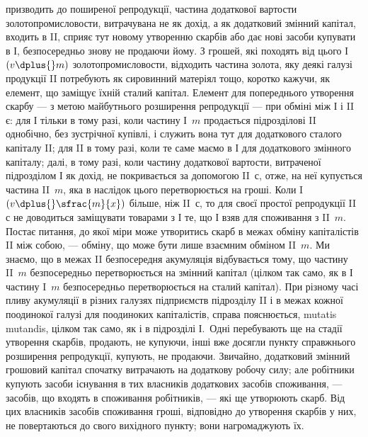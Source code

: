 \parcont{}  %
призводить до поширеної репродукції, частина додаткової вартости золотопромисловости,
витрачувана не як дохід, а як додатковий змінний
капітал, входить в II, сприяє тут новому утворенню скарбів або дає нові
засоби купувати в І, безпосередньо знову не продаючи йому. З грошей,
які походять від цього І~$(v \dplus{} m)$ золотопромисловости, відходить частина
золота, яку деякі галузі продукції II потребують як сировинний матеріял
тощо, коротко кажучи, як елемент, що заміщує їхній сталий капітал.
Елемент для попереднього утворення скарбу — з метою майбутнього розширення
репродукції — при обміні між І і II є: для І тільки в тому разі,
коли частину І~$m$ продається підрозділові II однобічно, без зустрічної
купівлі, і служить вона тут для додаткового сталого капіталу II; для II
в тому разі, коли те саме маємо в І для додаткового змінного капіталу;
далі, в тому разі, коли частину додаткової вартости, витраченої підрозділом
І як дохід, не покривається за допомогою II~$с$, отже, на неї купується
частина II~$m$, яка в наслідок цього перетворюється на гроші. Коли
I~$(v \dplus{} \sfrac{m}{x})$ більше, ніж II~$с$, то для своєї простої репродукції II~$с$ не
доводиться заміщувати товарами з І те, що І взяв для споживання з II~$m$.
Постає питання, до якої міри може утворитись скарб в межах обміну
капіталістів II між собою, — обміну, що може бути лише взаємним
обміном II~$m$. Ми знаємо, що в межах II безпосередня акумуляція відбувається
тому, що частину II~$m$ безпосередньо перетворюється на змінний
капітал (цілком так само, як в І частину I~$m$ безпосередньо перетворюється
на сталий капітал). При різному часі пливу акумуляції в різних галузях
підприємств підрозділу II і в межах кожної поодинокої галузі для поодиноких
капіталістів, справа пояснюється, mutatis mutandis, цілком так само,
як і в підрозділі І.~Одні перебувають ще на стадії утворення скарбів,
продають, не купуючи, інші вже досягли пункту справжнього розширення
репродукції, купують, не продаючи. Звичайно, додатковий змінний грошовий
капітал спочатку витрачають на додаткову робочу силу; але робітники
купують засоби існування в тих власників додаткових засобів
споживання, — засобів, що входять в споживання робітників, — які ще
утворюють скарб. Від цих власників засобів споживання гроші, відповідно
до утворення скарбів у них, не повертаються до свого вихідного
пункту; вони нагромаджують їх.
\label{original-409}
